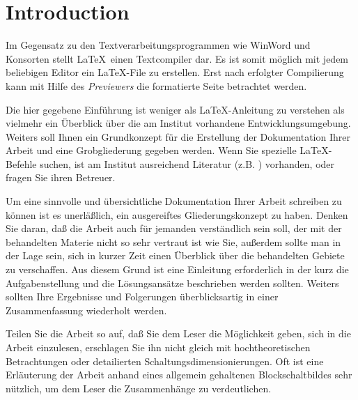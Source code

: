 \chapter{Introduction}

Im Gegensatz zu den Textverarbeitungsprogrammen wie WinWord und Konsorten
stellt \LaTeX\, einen Textcompiler dar.  Es ist somit möglich mit jedem
beliebigen Editor ein \LaTeX -File zu erstellen.  Erst nach erfolgter
Compilierung kann mit Hilfe des {\it Previewers} die formatierte Seite
betrachtet werden.

Die hier gegebene Einführung ist weniger als \LaTeX -Anleitung zu verstehen
als vielmehr ein Überblick über die am Institut vorhandene
Entwicklungsumgebung.  Weiters soll Ihnen ein Grundkonzept für die Erstellung
der Dokumentation Ihrer Arbeit und eine Grobgliederung gegeben werden.
Wenn Sie spezielle \LaTeX -Befehle suchen, ist am Institut ausreichend
Literatur (z.B. {\changefont \cite{Texbook}}) vorhanden, oder fragen Sie ihren Betreuer.

\bigskip

Um eine sinnvolle und übersichtliche Dokumentation Ihrer Arbeit schreiben zu
können ist es unerläßlich, ein ausgereiftes Gliederungskonzept zu haben.
Denken Sie daran, daß die Arbeit auch für jemanden verständlich sein soll,
der mit der behandelten Materie nicht so sehr vertraut ist wie Sie, außerdem
sollte man in der Lage sein, sich in kurzer Zeit einen Überblick über die
behandelten Gebiete zu verschaffen.  Aus diesem Grund ist eine Einleitung
erforderlich in der kurz die Aufgabenstellung und die Lösungsansätze
beschrieben werden sollten.  Weiters sollten Ihre Ergebnisse und Folgerungen
überblicksartig in einer Zusammenfassung wiederholt werden.

Teilen Sie die Arbeit so auf, daß Sie dem Leser die Möglichkeit geben, sich in
die Arbeit einzulesen, erschlagen Sie ihn nicht gleich mit hochtheoretischen
Betrachtungen oder detailierten Schaltungsdimensionierungen.  Oft ist eine
Erläuterung der Arbeit anhand eines allgemein gehaltenen Blockschaltbildes
sehr nützlich, um dem Leser die Zusammenhänge zu verdeutlichen.



